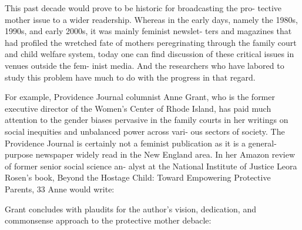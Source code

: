 
This past decade would prove to be historic for broadcasting the pro-
tective mother issue to a wider readership. Whereas in the early days,
namely the 1980s, 1990s, and early 2000s, it was mainly feminist newslet-
ters and magazines that had profiled the wretched fate of mothers
peregrinating through the family court and child welfare system, today
one can find discussion of these critical issues in venues outside the fem-
inist media. And the researchers who have labored to study this problem
have much to do with the progress in that regard. \pfl{}


For example, Providence Journal columnist Anne Grant, who is the
former executive director of the Women’s Center of Rhode Island, has
paid much attention to the gender biases pervasive in the family courts
in her writings on social inequities and unbalanced power across vari-
ous sectors of society. The Providence Journal is certainly not a feminist
publication as it is a general-purpose newspaper widely read in the New
England area. In her Amazon review of former senior social science an-
alyst at the National Institute of Justice Leora Rosen’s book, Beyond the
Hostage Child: Toward Empowering Protective Parents, 33 Anne would
write:


\noindent{}Grant concludes with plaudits for the author’s vision, dedication, and
commonsense approach to the protective mother debacle:

